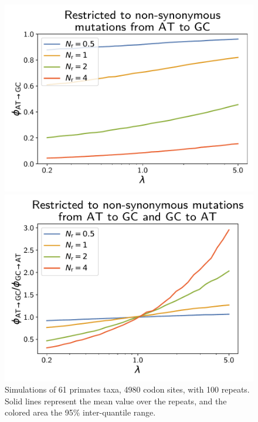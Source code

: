 \documentclass{article}
\begin{document}
\begin{figure}[h]
\begin{minipage}{0.32\linewidth}
 \includegraphics[width=\linewidth, page=1]{simulations/omega_WS}
 \end{minipage}
 \hfill
 \begin{minipage}{0.32\linewidth}
 \includegraphics[width=\linewidth, page=1]{simulations/omega_WS_over_SW}
 \end{minipage}
 \hfill
 \caption[$\atgc$ composition of the alignment]{
 Simulations of 61 primates taxa, 4980 codon sites, with 100 repeats. Solid lines represent the mean value over the repeats, and the colored area the 95\% inter-quantile range.
}
\end{figure}
\end{document}
